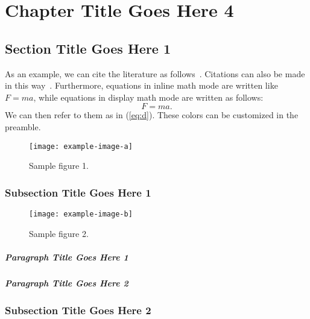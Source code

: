 \chapter{Chapter Title Goes Here 4}

\section{Section Title Goes Here 1}
As an example, we can cite the literature as follows~\cite{article-minimal,inbook-minimal}. Citations can also be made in this way~\cite{book-minimal,booklet-minimal,incollection-minimal}. Furthermore, equations in inline math mode are written like $F = ma$, while equations in display math mode are written as follows:
\begin{equation}
  \label{eq:d}
  F = ma.
\end{equation}
We can then refer to them as in (\ref{eq:d}). These colors can be customized in the preamble.

\lipsum[1-5]

\begin{figure}
  \centering
  \texttt{[image: example-image-a]}
  \caption{Sample figure 1.}
\end{figure}

\subsection{Subsection Title Goes Here 1}

\lipsum[6-9]

\begin{figure}
  \centering
  \texttt{[image: example-image-b]}
  \caption{Sample figure 2.}
\end{figure}

\paragraph{Paragraph Title Goes Here 1}

\lipsum[10]

\paragraph{Paragraph Title Goes Here 2}

\lipsum[11]

\subsection{Subsection Title Goes Here 2}

